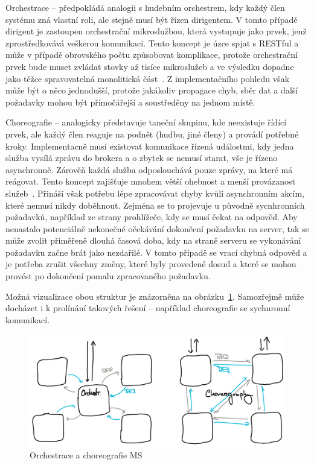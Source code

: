 \begin{dl}
   \item [Orchestrace] – předpokládá analogii s hudebním orchestrem, kdy každý člen systému zná vlastní roli, ale stejně musí být řízen dirigentem.
   V tomto případě dirigent je zastoupen orchestrační mikroslužbou, která vystupuje jako prvek, jenž zprostředkovává veškerou komunikaci.
   Tento koncept je úzce spjat s RESTful  a může v případě obrovského počtu  způsobovat komplikace, protože orchestrační prvek bude muset zvládat stovky až tisíce mikroslužeb a ve výsledku dopadne jako těžce spravovatelná monolitická část~\cite{choreovsorch}.
   Z implementačního pohledu však může být o něco jednodušší, protože jakákoliv propagace chyb, sběr dat a další požadavky mohou být přímočářejší a soustředěny na jednom místě.

   \item [Choreografie] – analogicky představuje taneční skupinu, kde neexistuje řídící prvek, ale každý člen reaguje na podnět (hudbu, jiné členy) a provádí potřebné kroky.
   Implementacně musí existovat komunikace řízená událostmi, kdy jedna služba vysílá zprávu do brokera a o zbytek se nemusí starat, vše je řízeno asynchronně.
   Zárověň každá služba odposlouchává pouze zprávy, na které má reágovat.
   Tento koncept zajišťuje mnohem větší ohebnost a menší provázanost služeb~\cite{choreovsorch}.
   Přináší však potřebu lépe zpracovávat chyby kvůli asynchronním akcím, které nemusí nikdy doběhnout.
   Zejména se to projevuje u původně sycnhronních požadavků, například ze strany prohlížeče, kdy se musí čekat na odpověd.
   Aby nenastalo potenciálně nekonečné očekávání dokončení požadavku na server, tak se může zvolit přiměřeně dlouhá časová doba, kdy na straně serveru se vykonávání požadavku začne brát jako nezdařilé.
   V tomto případě se vrací chybná odpověd a je potřeba zrušit všechny změny, které byly provedené dosud a které se mohou provést po dokončení pomalu zpracovaného požadavku.
\end{dl}

Možná vizualizace obou struktur je znázorněna na obrázku~\ref{fig:msa-structure-communication}.
Samozřejmě může docházet i k prolínání takových řešení – například choreografie se sychnronní komunikací.


\begin{figure}[htbp]
   \centering
   \includegraphics[max width=\textwidth]{assets/draft-msa-communication}
   \caption{Orchestrace a choreografie MS}\label{fig:msa-structure-communication}
\end{figure}



